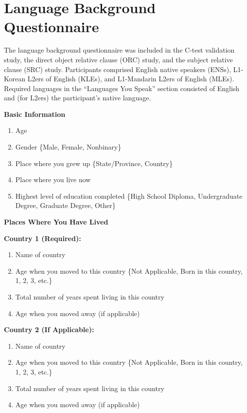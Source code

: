 
\chapter{Language Background Questionnaire}\label{app-lbq}

The language background questionnaire was included in the C-test validation study, the direct object relative clause (ORC) study, and the subject relative clause (SRC) study. Participants comprised English native speakers (ENSs), L1-Korean L2ers of English (KLEs), and L1-Mandarin L2ers of English (MLEs). Required languages in the ``Languages You Speak'' section consisted of English and (for L2ers) the participant's native language.\vspace{5pt}

\textbf{Basic Information}
\begin{enumerate}
\item Age 
\item Gender \{Male, Female, Nonbinary\} 
\item Place where you grew up \{State/Province, Country\} 
\item Place where you live now 
\item Highest level of education completed \{High School Diploma, Undergraduate Degree, Graduate Degree, Other\}
\end{enumerate}\vspace{10pt}

\textbf{Places Where You Have Lived}\\\vspace{5pt}

\textbf{Country 1 (Required):}
\begin{enumerate}
\item Name of country
\item Age when you moved to this country \{Not Applicable, Born in this country, 1, 2, 3, etc.\} 
\item Total number of years spent living in this country 
\item Age when you moved away (if applicable)
\end{enumerate}\vspace{10pt}

\textbf{Country 2 (If Applicable):}
\begin{enumerate}
\item Name of country
\item Age when you moved to this country \{Not Applicable, Born in this country, 1, 2, 3, etc.\}
\item Total number of years spent living in this country
\item Age when you moved away (if applicable)
\end{enumerate}\vspace{10pt}

